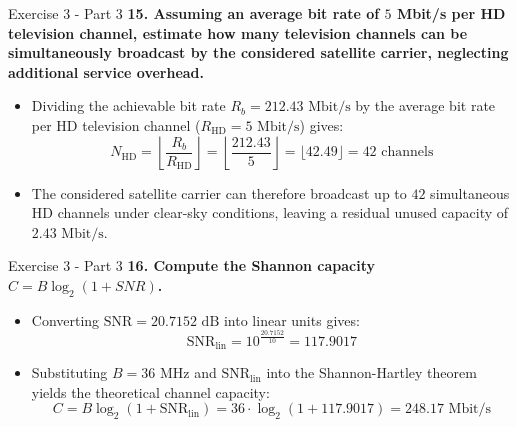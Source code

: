 \documentclass[10pt, aspectratio=169]{beamer}
\newcommand{\question}[1]{{\color{QuestionRed}\textbf{#1}}}
\begin{document}
	\begin{frame}{Exercise 3 - Part 3}
		\question{15. Assuming an average bit rate of $5$ Mbit/s per HD television channel, estimate how many television channels can be simultaneously broadcast by the considered satellite carrier, neglecting additional service overhead.}
		
		\vspace{0.1cm}
		\begin{itemize}
			\item Dividing the achievable bit rate $R_b = 212.43\text{ Mbit/s}$ by the average bit rate per HD television channel ($R_{\text{HD}} = 5\text{ Mbit/s}$) gives:
			\[
			N_{\text{HD}} = \left\lfloor \frac{R_b}{R_{\text{HD}}} \right\rfloor = \left\lfloor \frac{212.43}{5} \right\rfloor = \lfloor 42.49 \rfloor = 42\text{ channels}
			\]
			\item The considered satellite carrier can therefore broadcast up to $42$ simultaneous HD channels under clear-sky conditions, leaving a residual unused capacity of $2.43\text{ Mbit/s}$.
		\end{itemize}
		
	\end{frame}
	
	\begin{frame}{Exercise 3 - Part 3}
		\question{16. Compute the Shannon capacity $C = B\log_2(1+SNR)$.}
		
		\vspace{0.1cm}
		\begin{itemize}
			\item Converting $\text{SNR} = 20.7152\text{ dB}$ into linear units gives:
			\[
			\text{SNR}_{\text{lin}} = 10^{\frac{20.7152}{10}} = 117.9017
			\]
			\item Substituting $B = 36\text{ MHz}$ and $\text{SNR}_{\text{lin}}$ into the Shannon-Hartley theorem yields the theoretical channel capacity:
			\[
			C = B\log_2(1 + \text{SNR}_{\text{lin}}) = 36 \cdot \log_2(1 + 117.9017) = 248.17\text{ Mbit/s}
			\]
		\end{itemize}
		
	\end{frame}
	
\end{document}
